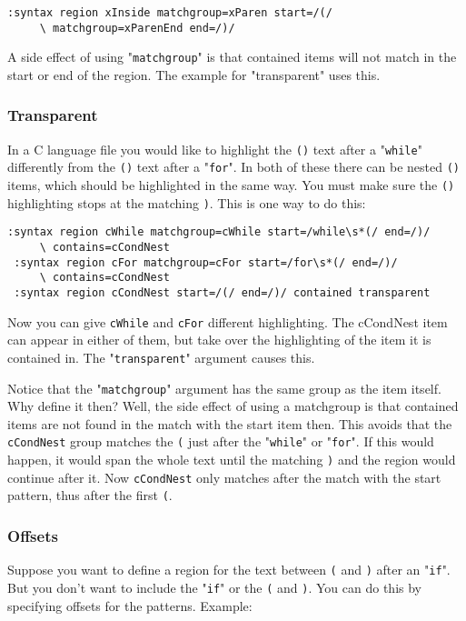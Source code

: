 \begin{Verbatim}[samepage=true]
 :syntax region xInside matchgroup=xParen start=/(/
     \ matchgroup=xParenEnd end=/)/
\end{Verbatim}

A side effect of using "\verb!matchgroup!" is that contained items will not match in the start or end of the region.
The example for "transparent" uses this.

\subsubsection{Transparent}
In a C language file you would like to highlight the \verb!()! text after a "\verb!while!" differently from the \verb!()! text after a "\verb!for!".
In both of these there can be nested \verb!()! items, which should be highlighted in the same way.
You must make sure the \verb!()! highlighting stops at the matching \verb!)!.
This is one way to do this:

\begin{Verbatim}[samepage=true]
 :syntax region cWhile matchgroup=cWhile start=/while\s*(/ end=/)/
     \ contains=cCondNest
 :syntax region cFor matchgroup=cFor start=/for\s*(/ end=/)/
     \ contains=cCondNest
 :syntax region cCondNest start=/(/ end=/)/ contained transparent
\end{Verbatim}

Now you can give \verb!cWhile! and \verb!cFor! different highlighting.
The cCondNest item can appear in either of them, but take over the highlighting of the item it is contained in.
The "\verb!transparent!" argument causes this.

Notice that the "\verb!matchgroup!" argument has the same group as the item itself.
Why define it then?  Well, the side effect of using a matchgroup is that contained items are not found in the match with the start item then.
This avoids that the \verb!cCondNest! group matches the \verb!(! just after the "\verb!while!" or "\verb!for!".
If this would happen, it would span the whole text until the matching \verb!)! and the region would continue after it.
Now \verb!cCondNest! only matches after the match with the start pattern, thus after the first \verb!(!.

\subsubsection{Offsets}
Suppose you want to define a region for the text between \verb!(! and \verb!)! after an "\verb!if!".
But you don't want to include the "\verb!if!" or the \verb!(! and \verb!)!.
You can do this by specifying offsets for the patterns.
Example:

